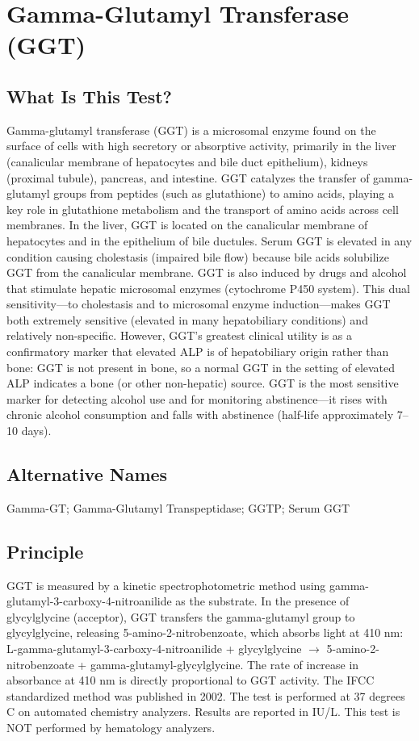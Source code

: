 \chapter{Gamma-Glutamyl Transferase (GGT)}

\section*{What Is This Test?}
Gamma-glutamyl transferase (GGT) is a microsomal enzyme found on the surface of cells with high secretory or absorptive activity, primarily in the liver (canalicular membrane of hepatocytes and bile duct epithelium), kidneys (proximal tubule), pancreas, and intestine. GGT catalyzes the transfer of gamma-glutamyl groups from peptides (such as glutathione) to amino acids, playing a key role in glutathione metabolism and the transport of amino acids across cell membranes. In the liver, GGT is located on the canalicular membrane of hepatocytes and in the epithelium of bile ductules. Serum GGT is elevated in any condition causing cholestasis (impaired bile flow) because bile acids solubilize GGT from the canalicular membrane. GGT is also induced by drugs and alcohol that stimulate hepatic microsomal enzymes (cytochrome P450 system). This dual sensitivity---to cholestasis and to microsomal enzyme induction---makes GGT both extremely sensitive (elevated in many hepatobiliary conditions) and relatively non-specific. However, GGT's greatest clinical utility is as a confirmatory marker that elevated ALP is of hepatobiliary origin rather than bone: GGT is not present in bone, so a normal GGT in the setting of elevated ALP indicates a bone (or other non-hepatic) source. GGT is the most sensitive marker for detecting alcohol use and for monitoring abstinence---it rises with chronic alcohol consumption and falls with abstinence (half-life approximately 7--10 days).

\section*{Alternative Names}
Gamma-GT; Gamma-Glutamyl Transpeptidase; GGTP; Serum GGT

\section*{Principle}
GGT is measured by a kinetic spectrophotometric method using gamma-glutamyl-3-carboxy-4-nitroanilide as the substrate. In the presence of glycylglycine (acceptor), GGT transfers the gamma-glutamyl group to glycylglycine, releasing 5-amino-2-nitrobenzoate, which absorbs light at 410 nm: L-gamma-glutamyl-3-carboxy-4-nitroanilide + glycylglycine $\rightarrow$ 5-amino-2-nitrobenzoate + gamma-glutamyl-glycylglycine. The rate of increase in absorbance at 410 nm is directly proportional to GGT activity. The IFCC standardized method was published in 2002. The test is performed at 37 degrees C on automated chemistry analyzers. Results are reported in IU/L. This test is NOT performed by hematology analyzers.

